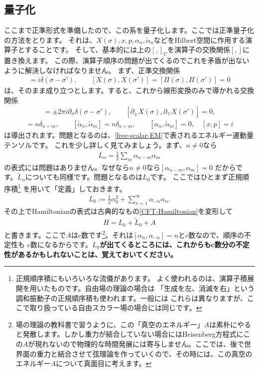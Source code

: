\documentclass[report,paper=a4, fontsize=12pt, line_length=16cm, number_of_lines=34,dvipdfmx]{jlreq}
\numberwithin{equation}{chapter}
\numberwithin{equation}{section}
\newcommand{\del}{\partial}
\newcommand{\kyou}[1]{{\sffamily \bfseries #1}}
\newcommand{\alphat}{\tilde{\alpha}}
\newcommand{\Lt}{\widetilde{L}}
\newcommand{\cbk}[1]{[#1]_{\mathrm{C}}}
\begin{document}
\subsection{量子化}
ここまで正準形式を準備したので、この系を量子化します。ここでは正準量子化の方法をとります。
それは、$X(\sigma),x,p,\alpha_n,\alphat_n$などをHilbert空間に作用する演算子とすることです。
そして、基本的には上の$\cbk{,}$を演算子の交換関係$[,]$に置き換えます。
この際、演算子順序の問題が出てくるのでこれを矛盾が出ないように解決しなければなりません。
まず、正準交換関係
\begin{align}
[X(\sigma),\Pi(\sigma')]=i\delta(\sigma-\sigma'),\qquad
[X(\sigma),X(\sigma')]=
[\Pi(\sigma),\Pi(\sigma')]=0
\end{align}
は、そのまま成り立つとします。すると、これから線形変換のみで導かれる交換関係
\begin{align}
[\del_{\pm}X(\sigma),\del_{\pm}X(\sigma')]
=\pm 2\pi i \del_{\sigma}\delta(\sigma-\sigma'),\qquad
[\del_{\pm}X(\sigma),\del_{\mp}X(\sigma')]=0,
\end{align}
\begin{align}
[\alpha_{n},\alpha_{m}]=n\delta_{n+m},\qquad
[\alphat_{n},\alphat_{m}]=n\delta_{n+m},\qquad
[\alpha_{n},\alphat_{m}]=0,\quad
[x,p]=i
\end{align}
は導出されます。問題となるのは、\eqref{free-scalar-EM}で表されるエネルギー運動量テンソルです。
これを少し詳しく見てみましょう。まず、$n\ne 0$なら
\begin{align}
L_n=\frac12 \sum_m \alpha_{n-m}\alpha_{m}
\end{align}
の表式には問題はありません。なぜなら$n\ne 0$なら$[\alpha_{n-m},\alpha_{m}]=0$
だからです。$\Lt_n$についても同様です。問題となるのは$L_0$です。
ここではひとまず正規順序積\footnote{正規順序積にもいろいろな流儀があります。
よく使われるのは、演算子積展開を用いたものです。自由場の理論の場合は
「生成を左、消滅を右」という調和振動子の正規順序積も使われます。一般には
これらは異なりますが、ここで取り扱っている自由スカラー場の場合には同じです。}
を用いて「定義」しておきます。
\begin{align}
L_0:=\frac12 \alpha_0^2+\sum_{n=1}^{\infty}\alpha_{-n}\alpha_{n}.
\end{align}
その上でHamiltonianの表式は古典的なもの\eqref{CFT-Hamiltonian}を変形して
\begin{align}
H=L_0+\Lt_0+A
\end{align}
と書きます。ここで$A$はc数です\footnote{場の理論の教科書で習うように、この「真空のエネルギー」$A$は素朴にやると発散します。しかし重力が結合していない場合にはHeisenberg方程式にこの$A$が現れないので物理的な時間発展には寄与しません。ここでは、後で世界面の重力と結合させて弦理論を作っていくので、その時には、この真空のエネルギー$A$について真面目に考えます。}。それは$[\alpha_n,\alpha_{-n}]=n$とc数なので、順序の不定性も
c数になるからです。\kyou{$L_0$が出てくるところには、これからもc数分の不定性があるかもしれないことは、覚えておいてください。}
\end{document}
